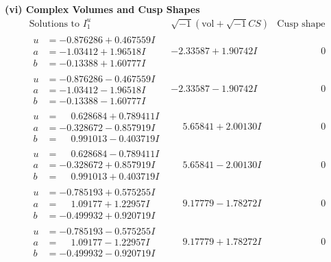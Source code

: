 \documentclass[1p]{elsarticle_modified}
\theoremstyle{definition}
\newcommand{\I}{\sqrt{-1}}
\begin{document}
\newpage\flushleft \textbf{(vi) Complex Volumes and Cusp Shapes}
$$\begin{array}{c|c|c}  
\text{Solutions to }I^u_{1}& \I (\text{vol} + \sqrt{-1}CS) & \text{Cusp shape}\\
 \hline 
\begin{aligned}
u &= -0.876286 + 0.467559 I \\
a &= -1.03412 + 1.96518 I \\
b &= -0.13388 + 1.60777 I\end{aligned}
 & -2.33587 + 1.90742 I & \phantom{-0.000000 } 0 \\ \hline\begin{aligned}
u &= -0.876286 - 0.467559 I \\
a &= -1.03412 - 1.96518 I \\
b &= -0.13388 - 1.60777 I\end{aligned}
 & -2.33587 - 1.90742 I & \phantom{-0.000000 } 0 \\ \hline\begin{aligned}
u &= \phantom{-}0.628684 + 0.789411 I \\
a &= -0.328672 - 0.857919 I \\
b &= \phantom{-}0.991013 - 0.403719 I\end{aligned}
 & \phantom{-}5.65841 + 2.00130 I & \phantom{-0.000000 } 0 \\ \hline\begin{aligned}
u &= \phantom{-}0.628684 - 0.789411 I \\
a &= -0.328672 + 0.857919 I \\
b &= \phantom{-}0.991013 + 0.403719 I\end{aligned}
 & \phantom{-}5.65841 - 2.00130 I & \phantom{-0.000000 } 0 \\ \hline\begin{aligned}
u &= -0.785193 + 0.575255 I \\
a &= \phantom{-}1.09177 + 1.22957 I \\
b &= -0.499932 + 0.920719 I\end{aligned}
 & \phantom{-}9.17779 - 1.78272 I & \phantom{-0.000000 } 0 \\ \hline\begin{aligned}
u &= -0.785193 - 0.575255 I \\
a &= \phantom{-}1.09177 - 1.22957 I \\
b &= -0.499932 - 0.920719 I\end{aligned}
 & \phantom{-}9.17779 + 1.78272 I & \phantom{-0.000000 } 0 \\ \hline\begin{aligned}

\end{aligned}
\end{array}$$
\end{document}
